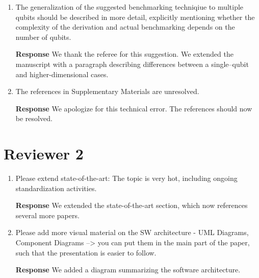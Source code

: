 \documentclass[a4paper,12pt]{article}
\newcommand{\1}{{\rm 1\hspace{-0.9mm}l}}
\newenvironment{response}{\vspace{1em}\noindent\textbf{Response}}{\vspace{1em}}
\begin{document}
\begin{enumerate}
    \begin{response}
      We modified manuscript to include mention of cross-entropy benchmarking
      as suggested by the referee.
    \end{response}
  \item The generalization of the suggested benchmarking techniqiue to multiple
    qubits should be described in more detail, explicitly mentioning whether
    the complexity of the derivation and actual benchmarking depends on the
    number of qubits.

    \begin{response}
      We thank the referee for this suggestion. We extended the manuscript with
      a paragraph describing differences between a single--qubit and
      higher-dimensional cases.
    \end{response}
  \item The references in Supplementary Materials are unresolved.

    \begin{response}
      We apologize for this technical error. The references should now be resolved.
    \end{response}
\end{enumerate}
\section{Reviewer 2}
\begin{enumerate}
  \item Please extend state-of-the-art: The topic is very hot, including ongoing
    standardization activities.

    \begin{response}
      We extended the state-of-the-art section, which now references several more papers.
    \end{response}
  \item Please add more visual material on the SW architecture - UML Diagrams, Component
    Diagrams --> you can put them in the main part of the paper, such
    that the presentation is easier to follow.

    \begin{response}
      We added a diagram summarizing the software architecture.
    \end{response}
\end{enumerate}
\end{document}
